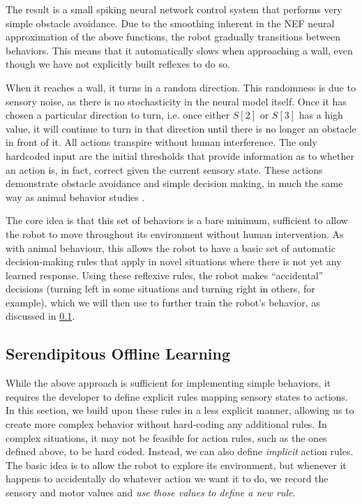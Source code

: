 \documentclass[conference]{IEEEtran}
\begin{document}
The result is a small spiking neural network control system that performs very 
simple obstacle avoidance. Due to the smoothing inherent in the NEF neural 
approximation of the above functions, the robot gradually transitions between 
behaviors. This means that it automatically slows when approaching a wall, 
even though we have not explicitly built reflexes to do so.  

When it reaches a wall, it turns in a random direction. This randomness is due 
to sensory noise, as there is no stochasticity in the neural model 
itself. Once it has chosen a particular direction to turn, i.e. once 
either $S[2]$ or $S[3]$ has a high value, it will continue to turn in that 
direction until there is no longer an obstacle in front of it. All actions 
transpire without human interference. The only hardcoded input are the initial 
thresholds that provide information as to whether an action is, in fact, 
correct given the current sensory state. These actions demonstrate obstacle 
avoidance and simple decision making, in much the same way as animal behavior 
studies \cite{kim2007encoding}. 

The core idea is that this set of behaviors is a bare minimum, sufficient to
allow the robot to move throughout its environment without human intervention.
As with animal behaviour, this allows the robot to have a basic set of automatic
decision-making rules that apply in novel situations where there is not yet
any learned response.  Using these reflexive rules, the robot makes ``accidental''
decisions (turning left in some situations and turning right in others, for
example), which we will then use to further train the robot's behavior, as
discussed in \ref{learning}.


\subsection{Serendipitous Offline Learning} \label{learning}

While the above approach is sufficient for implementing simple behaviors, it requires the developer to define explicit rules mapping sensory states to actions. In this section, we build upon these
rules in a less explicit manner, allowing us to create more complex behavior
without hard-coding any additional rules.  In complex situations, it may not be 
feasible for action rules, such as the ones defined above, to be hard coded. Instead,
we can also define \textit{implicit} action rules. The basic idea is to allow
the robot to explore its environment, but whenever it happens to accidentally
do whatever action we want it to do, we record the sensory and motor 
values and \textit{use those values to define a new rule}.
\end{document}
